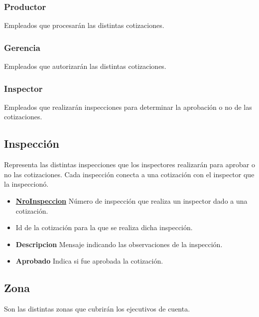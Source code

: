\documentclass[a4paper,11pt]{article}
\begin{document}
\subsubsection{Productor}

Empleados que procesarán las distintas cotizaciones.

\subsubsection{Gerencia}

Empleados que autorizarán las distintas cotizaciones.

\subsubsection{Inspector}

Empleados que realizarán inspecciones para determinar 
la aprobación o no de las cotizaciones.

\subsection{Inspección}

Representa las distintas inspecciones que los inspectores realizarán para aprobar o no las cotizaciones.
Cada inspección conecta a una cotización con el inspector que la inspeccionó.

\begin{itemize}
   
  \item \textbf{\uline{NroInspeccion}} Número de inspección que realiza un inspector dado a una cotización.
  
  \item \textbf{} Id de la cotización para la que se realiza dicha inspección.
    
  \item \textbf{Descripcion} Mensaje indicando las observaciones de la inspección.

  \item \textbf{Aprobado} Indica si fue aprobada la cotización.
    
\end{itemize}

\subsection{Zona}

Son las distintas zonas que cubrirán los ejecutivos de cuenta.
\end{document}
